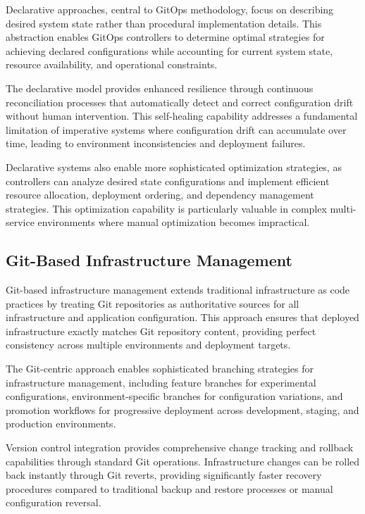 Declarative approaches, central to GitOps methodology, focus on describing desired system state rather than procedural implementation details. This abstraction enables GitOps controllers to determine optimal strategies for achieving declared configurations while accounting for current system state, resource availability, and operational constraints.

The declarative model provides enhanced resilience through continuous reconciliation processes that automatically detect and correct configuration drift without human intervention. This self-healing capability addresses a fundamental limitation of imperative systems where configuration drift can accumulate over time, leading to environment inconsistencies and deployment failures.

Declarative systems also enable more sophisticated optimization strategies, as controllers can analyze desired state configurations and implement efficient resource allocation, deployment ordering, and dependency management strategies. This optimization capability is particularly valuable in complex multi-service environments where manual optimization becomes impractical.

\subsection{Git-Based Infrastructure Management}

Git-based infrastructure management extends traditional infrastructure as code practices by treating Git repositories as authoritative sources for all infrastructure and application configuration. This approach ensures that deployed infrastructure exactly matches Git repository content, providing perfect consistency across multiple environments and deployment targets.

The Git-centric approach enables sophisticated branching strategies for infrastructure management, including feature branches for experimental configurations, environment-specific branches for configuration variations, and promotion workflows for progressive deployment across development, staging, and production environments.

Version control integration provides comprehensive change tracking and rollback capabilities through standard Git operations. Infrastructure changes can be rolled back instantly through Git reverts, providing significantly faster recovery procedures compared to traditional backup and restore processes or manual configuration reversal.

